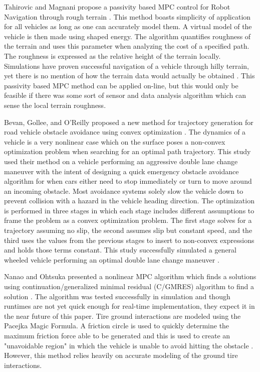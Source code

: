 \documentclass[12pt,onecolumn]{article}
\begin{document}
Tahirovic and Magnani propose a passivity based MPC control for Robot Navigation through rough terrain \cite{Tahirovic&Magnani2010}. This method boasts simplicity of application for all vehicles as long as one can accurately model them. A virtual model of the vehicle is then made using shaped energy. The algorithm quantifies roughness of the terrain and uses this parameter when analyzing the cost of a specified path. The roughness is expressed as the relative height of the terrain locally. Simulations have proven successful navigation of a vehicle through hilly terrain, yet there is no mention of how the terrain data would actually be obtained \cite{Tahirovic&Magnani2010}. This passivity based MPC method can be applied on-line, but this would only be feasible if there was some sort of sensor and data analysis algorithm which can sense the local terrain roughness.

Bevan, Gollee, and O'Reilly proposed a new method for trajectory generation for road vehicle obstacle avoidance using convex optimization \cite{Bevan&Gollee2010}. The dynamics of a vehicle is a very nonlinear case which on the surface poses a non-convex optimization problem when searching for an optimal path trajectory. This study used their method on a vehicle performing an aggressive double lane change maneuver with the intent of designing a quick emergency obstacle avoidance algorithm for when cars either need to stop immediately or turn to move around an incoming obstacle. Most avoidance systems solely slow the vehicle down to prevent collision with a hazard in the vehicle heading direction. The optimization is performed in three stages in which each stage includes different assumptions to frame the problem as a convex optimization problem. The first stage solves for a trajectory assuming no slip, the second assumes slip but constant speed, and the third uses the values from the previous stages to insert to non-convex expressions and holds those terms constant. This study successfully simulated a general wheeled vehicle performing an optimal double lane change maneuver \cite{Bevan&Gollee2010}.

Nanao and Ohtsuka presented a nonlinear MPC algorithm which finds a solutions using continuation/generalized minimal residual (C/GMRES) algorithm to find a solution \cite{Nanao&Ohtsuka2010}. The algorithm was tested successfully in simulation and though runtimes are not yet quick enough for real-time implementation, they expect it in the near future of this paper. Tire ground interactions are modeled using the Pacejka Magic Formula. A friction circle is used to quickly determine the maximum friction force able to be generated and this is used to create an "unavoidable region" in which the vehicle is unable to avoid hitting the obstacle \cite{Nanao&Ohtsuka2010}. However, this method relies heavily on accurate modeling of the ground tire interactions.
\end{document}
